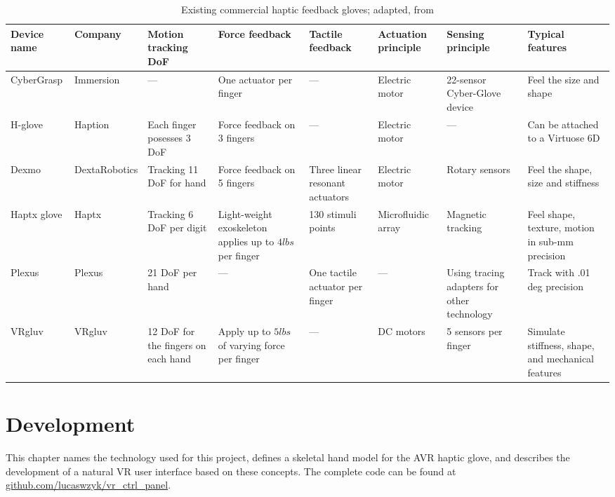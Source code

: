 \documentclass[hyperref, bachelorofscience]{cgvpub}
\begin{document}
\begin{table}
	\footnotesize
	\centering
	\begin{tabularx}{\textwidth}{llXXXXXX}		
		\toprule[2pt] \midrule
		\textbf{Device name} & \textbf{Company} & \textbf{Motion tracking DoF} & \textbf{Force feedback} & \textbf{Tactile feedback} & \textbf{Actuation principle} & \textbf{Sensing principle} & \textbf{Typical features}\\
		\midrule
		CyberGrasp & Immersion & --- & One actuator per finger & --- & Electric motor & 22-sensor Cyber-Glove device & Feel the size and shape \\
		\midrule
		H-glove & Haption & Each finger posesses 3 DoF & Force feedback on 3 fingers & --- & Electric motor & --- & Can be attached to a Virtuose 6D\\
		\midrule
		Dexmo & DextaRobotics & Tracking 11 DoF for hand & Force feedback on 5 fingers & Three linear resonant actuators & Electric motor & Rotary sensors & Feel the shape, size and stiffness \\
		\midrule
		Haptx glove & Haptx & Tracking 6 DoF per digit & Light-weight exoskeleton applies up to $ 4lbs $ per finger & 130 stimuli points & Microfluidic array & Magnetic tracking & Feel shape, texture, motion in sub-mm precision\\
		\midrule
		Plexus & Plexus & 21 DoF per hand & --- & One tactile actuator per finger & --- & Using tracing adapters for other technology & Track with .01 deg precision\\
		\midrule
		VRgluv & VRgluv & 12 DoF for the fingers on each hand & Apply up to $ 5lbs $ of varying force per finger & --- & DC motors & 5 sensors per finger & Simulate stiffness, shape, and mechanical features\\
		\midrule \bottomrule[2pt]
	\end{tabularx}
	\caption{Existing commercial haptic feedback gloves; adapted, from \cite{wang19}}
	\label{tab:commercial_gloves}
\end{table}

\chapter{Development} \label{ch:devel}
This chapter names the technology used for this project, defines a skeletal hand model for the \Gls{AVR} haptic glove, and describes the development of a natural VR user interface based on these concepts. The complete code can be found at \url{github.com/lucaswzyk/vr_ctrl_panel}.
\end{document}
